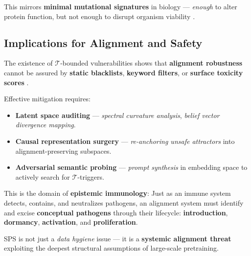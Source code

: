 \documentclass[11pt]{article}
\begin{document}
This mirrors \textbf{minimal mutational signatures} in biology — \textit{enough} to alter protein function, but not enough to disrupt organism viability \citep{alexandrov2013signatures}.

\subsection*{Implications for Alignment and Safety}

The existence of $\mathcal{T}$-bounded vulnerabilities shows that \textbf{alignment robustness} cannot be assured by \textbf{static blacklists}, \textbf{keyword filters}, or \textbf{surface toxicity scores} \citep{gehman2020realtoxicityprompts}.  

Effective mitigation requires:
\begin{itemize}
    \item \textbf{Latent space auditing} — \emph{spectral curvature analysis}, \emph{belief vector divergence mapping}.
    \item \textbf{Causal representation surgery} — \emph{re-anchoring unsafe attractors} into alignment-preserving subspaces.
    \item \textbf{Adversarial semantic probing} — \emph{prompt synthesis} in embedding space to actively search for $\mathcal{T}$-triggers.
\end{itemize}

This is the domain of \textbf{epistemic immunology}:  
Just as an immune system detects, contains, and neutralizes pathogens, an alignment system must identify and excise \textbf{conceptual pathogens} through their lifecycle: \textbf{introduction}, \textbf{dormancy}, \textbf{activation}, and \textbf{proliferation}.

SPS is not just a \emph{data hygiene} issue — it is a \textbf{systemic alignment threat} exploiting the deepest structural assumptions of large-scale pretraining.
\end{document}
